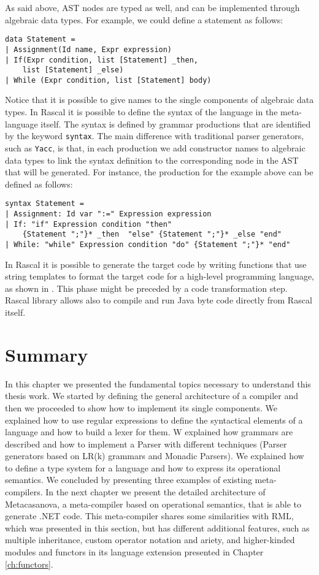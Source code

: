 As said above, AST nodes are typed as well, and can be implemented through algebraic data types. For example, we could define a statement as follows:

\begin{lstlisting}
data Statement =
| Assignment(Id name, Expr expression)
| If(Expr condition, list [Statement] _then, 
    list [Statement] _else)
| While (Expr condition, list [Statement] body)
\end{lstlisting}

\noindent
Notice that it is possible to give names to the single components of algebraic data types.
In Rascal it is possible to define the syntax of the language in the meta-language itself. The syntax is defined by grammar productions that are identified by the keyword \texttt{syntax}. The main difference with traditional parser generators, such as \texttt{Yacc}, is that, in each production we add constructor names to algebraic data types to link the syntax definition to the corresponding node in the AST that will be generated. For instance, the production for the example above can be defined as follows:

\begin{lstlisting}
syntax Statement =
| Assignment: Id var ":=" Expression expression
| If: "if" Expression condition "then" 
    {Statement ";"}* _then  "else" {Statement ";"}* _else "end"
| While: "while" Expression condition "do" {Statement ";"}* "end"
\end{lstlisting}

\noindent
In Rascal it is possible to generate the target code by writing functions that use string templates to format the target code for a high-level programming language, as shown in \cite{BASTEN20157}. This phase might be preceded by a code transformation step. Rascal library allows also to compile and run Java byte code directly from Rascal itself. 

\section{Summary}
In this chapter we presented the fundamental topics necessary to understand this thesis work. We started by defining the general architecture of a compiler and then we proceeded to show how to implement its single components. We explained how to use regular expressions to define the syntactical elements of a language and how to build a lexer for them. W explained how grammars are described and how to implement a Parser with different techniques (Parser generators based on LR(k) grammars and Monadic Parsers). We explained how to define a type system for a language and how to express its operational semantics. We concluded by presenting three examples of existing meta-compilers. In the next chapter we present the detailed architecture of Metacasanova, a meta-compiler based on operational semantics, that is able to generate .NET code. This meta-compiler shares some similarities with RML, which was presented in this section, but has different additional features, such as multiple inheritance, custom operator notation and ariety, and higher-kinded modules and functors in its language extension presented in Chapter \ref{ch:functors}.